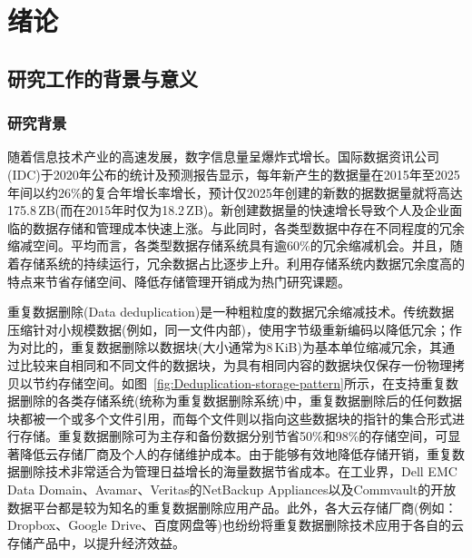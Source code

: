 \chapter{绪\hspace{6pt}论}
\label{chapter:introduction}

\section{研究工作的背景与意义}
\label{sec:intro}
\subsection{研究背景}
\label{subsec:intro-background}

随着信息技术产业的高速发展，数字信息量呈爆炸式增长。国际数据资讯公司(IDC)于2020年公布的统计及预测报告显示，每年新产生的数据量在2015年至2025年间以约26\%的复合年增长率增长，预计仅2025年创建的新数的据数据量就将高达175.8\,ZB(而在2015年时仅为18.2\,ZB)。新创建数据量的快速增长导致个人及企业面临的数据存储和管理成本快速上涨。与此同时，各类型数据中存在不同程度的冗余缩减空间。平均而言，各类型数据存储系统具有逾60\%的冗余缩减机会。并且，随着存储系统的持续运行，冗余数据占比逐步上升。利用存储系统内数据冗余度高的特点来节省存储空间、降低存储管理开销成为热门研究课题。

重复数据删除(Data deduplication)是一种粗粒度的数据冗余缩减技术。传统数据压缩针对小规模数据(例如，同一文件内部)，使用字节级重新编码以降低冗余；作为对比的，重复数据删除以数据块(大小通常为8\,KiB)为基本单位缩减冗余，其通过比较来自相同和不同文件的数据块，为具有相同内容的数据块仅保存一份物理拷贝以节约存储空间。如图~\ref{fig:Deduplication-storage-pattern}所示，在支持重复数据删除的各类存储系统(统称为重复数据删除系统)中，重复数据删除后的任何数据块都被一个或多个文件引用，而每个文件则以指向这些数据块的指针的集合形式进行存储。重复数据删除可为主存和备份数据分别节省50\%和98\%的存储空间，可显著降低云存储厂商及个人的存储维护成本。由于能够有效地降低存储开销，重复数据删除技术非常适合为管理日益增长的海量数据节省成本。在工业界，Dell EMC Data Domain、Avamar、Veritas的NetBackup Appliances以及Commvault的开放数据平台都是较为知名的重复数据删除应用产品。此外，各大云存储厂商(例如：Dropbox、Google Drive、百度网盘等)也纷纷将重复数据删除技术应用于各自的云存储产品中，以提升经济效益。

